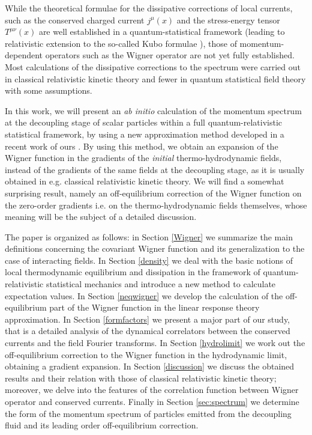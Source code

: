 \documentclass[prd,superscriptaddress,nofootinbib,notitlepage]{revtex4-1}
\begin{document}
While the theoretical formulae for the dissipative corrections of local currents, such as the conserved charged current 
$j^\mu(x)$ and the stress-energy tensor $T^{\mu\nu}(x)$ are well established in a quantum-statistical framework \cite{Zub2,Becattini:2019dxo,Jeon:1995zm,Harutyunyan:2021rmb} (leading to relativistic extension to the so-called 
Kubo formulae \cite{Kubo1991}), those of momentum-dependent operators such as the Wigner operator are not yet fully established. 
Most calculations of the dissipative corrections to the spectrum were carried out in classical relativistic kinetic theory \cite{Hidaka:2016yjf,Zhang:2019xya,Romatschke:2017ejr,Weickgenannt:2022qvh,Bhadury:2020puc,Yang:2020hri,Wang:2025mfz} and
fewer in quantum statistical field theory \cite{Buzzegoli:2025zud,Li:2025pef} with some assumptions. 

In this work, we will present an {\em ab initio} calculation of the momentum spectrum at the decoupling stage of scalar particles within
a full quantum-relativistic statistical framework, by using a new approximation method developed in a recent work of ours 
\cite{Sheng:2025cjk}. By using this method, we obtain an expansion of the Wigner function in the gradients of the {\em initial} 
thermo-hydrodynamic fields, instead of the gradients of the same fields at the decoupling stage, as it is usually obtained in 
e.g. classical relativistic kinetic theory. We will find a somewhat surprising result, namely an off-equilibrium correction of 
the Wigner function on the zero-order gradients i.e. on the thermo-hydrodynamic fields themselves, whose meaning will be the 
subject of a detailed discussion.

The paper is organized as follows: in Section \ref{Wigner} we summarize the main definitions concerning the covariant Wigner 
function and its generalization to the case of interacting fields. In Section \ref{density} we deal with the basic notions of local thermodynamic equilibrium and dissipation in the framework of quantum-relativistic statistical mechanics and introduce a new method to calculate expectation values. In Section \ref{neqwigner} we develop the calculation of the off-equilibrium part of the Wigner 
function in the linear response theory approximation. In Section \ref{formfactors} we present a major part of our study, that is 
a detailed analysis of the dynamical correlators between the conserved currents and the field Fourier transforms. In 
Section \ref{hydrolimit} we work out the off-equilibrium correction to the Wigner function in the hydrodynamic limit, obtaining
a gradient expansion. In Section \ref{discussion} we discuss the obtained results and their relation with those of classical
relativistic kinetic theory; moreover, we delve into the features of the correlation function between Wigner operator and 
conserved currents. Finally in Section \ref{sec:spectrum} we determine the form of the momentum spectrum of particles emitted
from the decoupling fluid and its leading order off-equilibrium correction.
\end{document}
